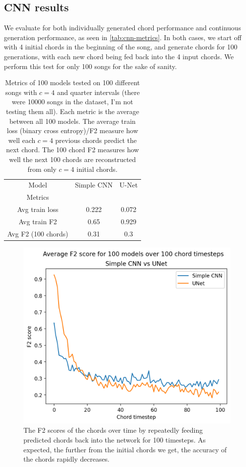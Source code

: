 \documentclass[
	a4paper, %
	10pt, %
	unnumberedsections, %
	twoside, %
]{LTJournalArticle}
\begin{document}
\subsection{CNN results}

We evaluate for both individually generated chord performance and continuous generation performance, as seen in \autoref{tab:cnn-metrics}. In both cases, we start off with 4 initial chords in the beginning of the song, and generate chords for 100 generations, with each new chord being fed back into the 4 input chords. We perform this test for only 100 songs for the sake of sanity.

\begin{table}
	\caption{Metrics of 100 models tested on 100 different songs with $c=4$ and quarter intervals (there were 10000 songs in the dataset, I'm not testing them all). Each metric is the average between all 100 models. The average train loss (binary cross entropy)/F2 measure how well each $c=4$ previous chords predict the next chord. The 100 chord F2 measures how well the next 100 chords are reconstructed from only $c=4$ initial chords.}
	\centering
	\begin{tabular}{|c||c|c|} 
     \hline
     Model & Simple CNN & U-Net \\
     Metrics && \\
     \hline\hline
     Avg train loss & 0.222 & 0.072 \\ 
     \hline
     Avg train F2 & 0.65 & 0.929 \\
     \hline
     Avg F2 (100 chords) & 0.31 & 0.3 \\
     \hline
    \end{tabular}
	\label{tab:cnn-metrics}
\end{table}

\begin{figure}
    \centering
    \includegraphics[width=\linewidth]{images/simplecnnvsunet.png}
    \caption{The F2 scores of the chords over time by repeatedly feeding predicted chords back into the network for 100 timesteps. As expected, the further from the initial chords we get, the accuracy of the chords rapidly decreases.}
    \label{fig:cnn-comp}
\end{figure}
\end{document}
